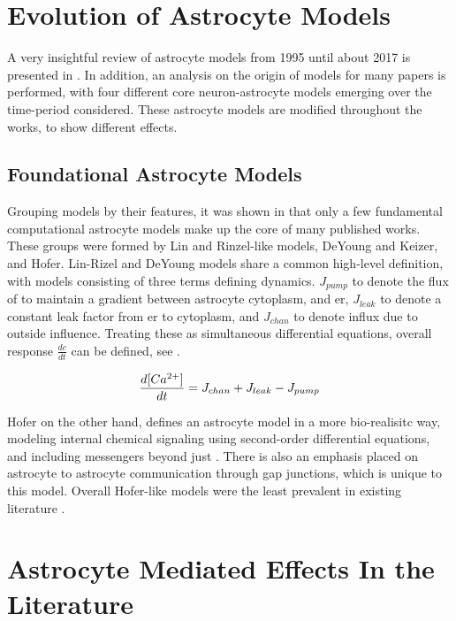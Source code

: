     \section{Evolution of Astrocyte Models}
    A very insightful review of astrocyte models from 1995 until about 2017 is
    presented in \parencite{manninen_2018}. In addition, an analysis on the origin
    of models for many papers is performed, with four different core
    neuron-astrocyte models emerging over the time-period considered. These
    astrocyte models are modified throughout the works, to show different
    effects.

    \subsection{Foundational Astrocyte Models}
    Grouping models by their features, it was shown in \parencite{manninen_2018}
    that only a few fundamental computational astrocyte models make up the core
    of many published works. These groups were formed by Lin and Rinzel-like
    models, DeYoung and Keizer, and Hofer. Lin-Rizel and DeYoung models share a
    common high-level definition, with models consisting of three terms defining
    \ca dynamics. $J_{pump}$ to denote the flux of \ca to maintain a gradient
    between astrocyte cytoplasm, and \gls{er}, $J_{leak}$ to denote a constant
    leak factor from \gls{er} to cytoplasm, and $J_{chan}$ to denote \ca influx
    due to outside influence. Treating these as simultaneous differential
    equations, overall \ca response $\frac{dc}{dt}$ can be defined, see
    .

    \begin{align}
      \frac{d[Ca^{2+}]}{dt} = J_{chan} + J_{leak} -
      J_{pump} \label{eq:lr_dk_astro} \\
    \end{align}

    Hofer on the other hand, defines an astrocyte model in a more bio-realisitc
    way, modeling internal chemical signaling using second-order differential
    equations, and including messengers beyond just \ipt. There is also an
    emphasis placed on astrocyte to astrocyte communication through gap
    junctions, which is unique to this model. Overall Hofer-like models were the
    least prevalent in existing literature \parencite{manninen_2018}.

    
    \section{Astrocyte Mediated Effects In the Literature}
